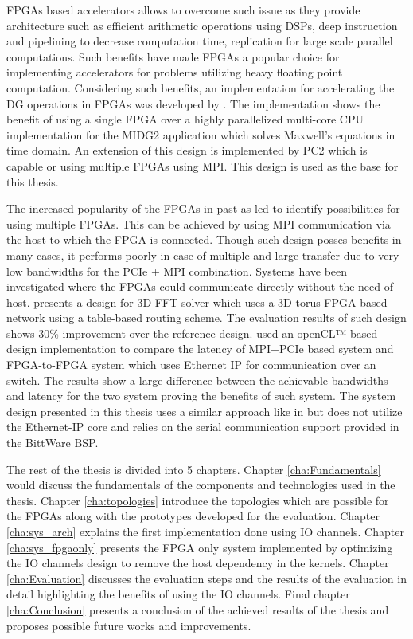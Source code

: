 FPGAs based accelerators allows to overcome such issue as they provide architecture
such as efficient arithmetic operations using DSPs, deep instruction and pipelining
to decrease computation time, replication for large scale parallel computations.
Such benefits have made FPGAs a popular choice for implementing accelerators for
problems utilizing heavy floating point computation. Considering such benefits,
an implementation for accelerating the \ac{DG} operations in FPGAs was
developed by \textcite{kenter_opencl-based_2018}. The implementation shows the benefit
of using a single FPGA over a highly parallelized multi-core CPU implementation for
the MIDG2 application which solves Maxwell’s equations in time domain. An extension
of this design is implemented by PC2 which is capable or using multiple FPGAs using MPI.
This design is used as the base for this thesis.

The increased popularity of the FPGAs in past as led to identify possibilities for
using multiple FPGAs. This can be achieved by using MPI communication via the host
to which the FPGA is connected. Though such design posses benefits in many cases,
it performs poorly in case of multiple and large transfer due to very low bandwidths
for the PCIe + MPI combination. Systems have been investigated where the FPGAs could
communicate directly without the need of host. \textcite{sheng_hpc_2017} presents a design
for 3D FFT solver which uses a 3D-torus FPGA-based network using a table-based routing
scheme. The evaluation results of such design shows 30\% improvement over the reference design.
\textcite{kobayashi_opencl-ready_2018} used an openCL™ based design implementation to
compare the latency of MPI+PCIe based system and FPGA-to-FPGA system which uses Ethernet
IP for communication over an switch. The results show a large difference between the achievable
bandwidths and latency for the two system proving the benefits of such system. The system
design presented in this thesis uses a similar approach like in \cite{kobayashi_opencl-ready_2018}
but does not utilize the Ethernet-IP core and relies on the serial communication
support provided in the BittWare BSP.

The rest of the thesis is divided into 5 chapters. Chapter \ref{cha:Fundamentals} would
discuss the fundamentals of the components and technologies used in the thesis.
Chapter \ref{cha:topologies} introduce the topologies which are possible for the FPGAs
along with the prototypes developed for the evaluation. Chapter \ref{cha:sys_arch}
explains the first implementation done using IO channels. Chapter \ref{cha:sys_fpgaonly}
presents the FPGA only system implemented by optimizing the IO channels design
to remove the host dependency in the kernels. Chapter \ref{cha:Evaluation} discusses the evaluation steps
and the results of the evaluation in detail highlighting the benefits of using the IO channels.
Final chapter \ref{cha:Conclusion} presents a conclusion of the achieved results of the thesis
and proposes possible future works and improvements.